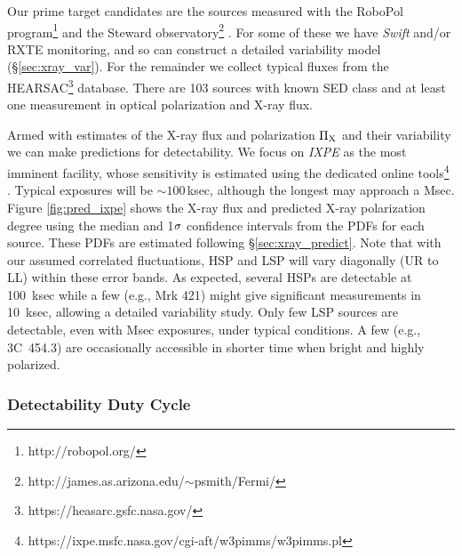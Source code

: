 Our prime target candidates are the sources measured with the RoboPol 
program\footnote{http://robopol.org/} \citep{pavlidou_robopol_2014,blinov_robopol_2018} and the Steward 
observatory\footnote{http://james.as.arizona.edu/$\sim$psmith/Fermi/} \citep{smith_coordinated_2009}. 
For some of these we have {\it Swift} and/or RXTE monitoring, and so can construct a detailed
variability model (\S \ref{sec:xray_var}). For the remainder we collect typical fluxes from
the HEARSAC\footnote{https://heasarc.gsfc.nasa.gov/} database. There are 103 
sources with known SED class and at least one measurement in optical polarization and X-ray flux.

	Armed with estimates of the X-ray flux and polarization $\rm \Pi_X$ and their variability
we can make predictions for detectability. We focus on {\it IXPE} as the most imminent facility, whose
sensitivity is estimated using the dedicated online tools\footnote{https://ixpe.msfc.nasa.gov/cgi-aft/w3pimms/w3pimms.pl} \citep{soffitta_ixpe_2017,odell_imaging_2018}. Typical exposures will be $\sim 100\,$ksec, although the longest may approach a Msec. Figure 
\ref{fig:pred_ixpe} shows the X-ray flux and predicted X-ray polarization degree using the median 
and 1$\rm \sigma$ confidence intervals from the PDFs for each source. These PDFs are
estimated following \S \ref{sec:xray_predict}. Note that with our assumed 
correlated fluctuations, HSP and LSP will vary diagonally (UR to LL) within these error bands.
As expected, several HSPs are detectable at 100~ksec while a few (e.g., Mrk 421) might give
significant measurements in 10~ksec, allowing a detailed variability study. Only few LSP sources
are detectable, even with Msec exposures, under typical conditions.  A few 
(e.g., 3C~454.3) are occasionally accessible in shorter time when bright 
and highly polarized.


\subsubsection{Detectability Duty Cycle}
\label{sec:duty_cycle}

